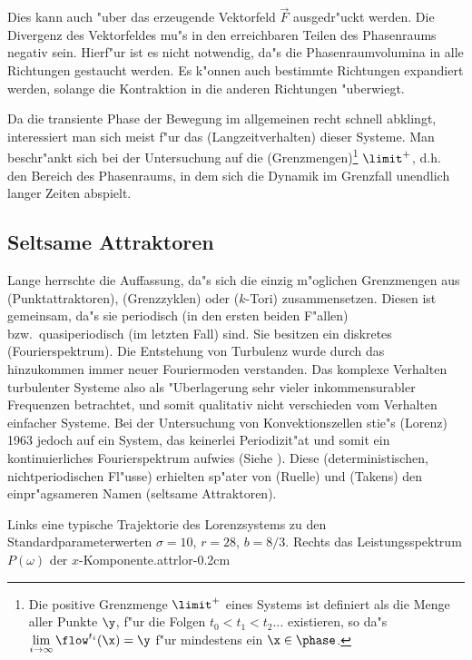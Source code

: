 Dies kann auch "uber das erzeugende Vektorfeld $\vec F$ ausgedr"uckt werden. Die Divergenz
des Vektorfeldes mu"s in den erreichbaren Teilen des Phasenraums negativ sein.
Hierf"ur ist es nicht notwendig, da"s die Phasenraumvolumina in alle Richtungen gestaucht
werden. Es k"onnen auch bestimmte Richtungen expandiert werden, solange die Kontraktion in
die anderen Richtungen "uberwiegt.

Da die transiente Phase der Bewegung im allgemeinen recht schnell abklingt, interessiert
man sich meist f"ur das \begriff(Langzeitverhalten) dieser Systeme. Man beschr"ankt sich bei
der Untersuchung auf die \begriff(Grenzmengen)\footnote{Die positive Grenzmenge $\limit^+$
eines Systems ist definiert als die Menge aller Punkte $\y$, f"ur die  
Folgen $t_0\lt t_1\lt t_2\dots$ existieren, so da"s $\lim\limits_{i\to\infty}\flow^{t_i}(\x)=\y$
f"ur mindestens ein $\x\in\phase$.} $\limit^+$, d.h. den Bereich des
Phasenraums, in dem sich die Dynamik im Grenzfall unendlich langer Zeiten abspielt. 

\subsection{Seltsame Attraktoren}
Lange herrschte die Auffassung, da"s sich die einzig m"oglichen Grenzmengen aus
\begriff(Punkt\-attraktoren), \begriff(Grenzzyklen) oder \begriff($k$-Tori)
zusammensetzen. Diesen ist gemeinsam, da"s sie periodisch (in den ersten beiden F"allen)
bzw.\ quasiperiodisch (im letzten Fall) sind. Sie besitzen ein diskretes \begriff(Fourierspektrum).
Die Entstehung von Turbulenz wurde durch das hinzukommen immer neuer
Fouriermoden verstanden. Das komplexe Verhalten turbulenter Systeme also als "Uberlagerung
sehr vieler inkommensurabler Frequenzen betrachtet, und somit qualitativ nicht verschieden vom
Verhalten einfacher Systeme. Bei der Untersuchung von Konvektionszellen stie"s
\autor(Lorenz) 1963 \cite{Lorenz63} jedoch auf ein System, das keinerlei Periodizit"at
und somit ein kontinuierliches Fourierspektrum aufwies (Siehe ). Diese 
\begriff(deterministischen, nichtperiodischen Fl"usse) erhielten sp"ater von \autor(Ruelle)
und \autor(Takens) \cite{Ruelle71a} den einpr"agsameren Namen \begriff(seltsame Attraktoren). 


{Links eine typische Trajektorie des Lorenzsystems zu den 
Standardparameterwerten $\sigma =10$, $r=28$, $b=8/3$. Rechts das Leistungsspektrum $P(\omega)$ der 
$x$-Komponente.}{attrlor}{-0.2cm}

